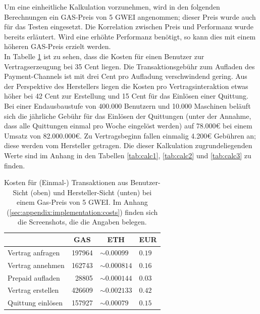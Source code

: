 Um eine einheitliche Kalkulation vorzunehmen, wird in den folgenden Berechnungen ein GAS-Preis von 5 GWEI angenommen; dieser Preis wurde auch für das Testen eingesetzt. Die Korrelation zwischen Preis und Performanz wurde bereits erläutert. Wird eine erhöhte Performanz benötigt, so kann dies mit einem höheren GAS-Preis erzielt werden.\\
In Tabelle \ref{tab:costs} ist zu sehen, dass die Kosten für einen Benutzer zur Vertragserzeugung bei 35 Cent liegen. Die Transaktionsgebühr zum Aufladen des Payment-Channels ist mit drei Cent pro Aufladung verschwindend gering. Aus der Perspektive des Herstellers liegen die Kosten pro Vertragsinteraktion etwas höher bei 42 Cent zur Erstellung und 15 Cent für das Einlösen einer Quittung. Bei einer Endausbaustufe von 400.000 Benutzern und 10.000 Maschinen beläuft sich die jährliche Gebühr für das Einlösen der Quittungen (unter der Annahme, dass alle Quittungen einmal pro Woche eingelöst werden) auf 78.000€ bei einem Umsatz von 82.000.000€. Zu Vertragsbeginn fallen einmalig 4.200€ Gebühren an; diese werden vom Hersteller getragen. Die dieser Kalkulation zugrundeliegenden Werte sind im Anhang in den Tabellen \ref{tab:calc1}, \ref{tab:calc2} und \ref{tab:calc3} zu finden.\\

\begin{table}[h]
\centering
\begin{tabular}{@{}lrll@{}}
\toprule
\multicolumn{1}{c}{\textbf{}} & \multicolumn{1}{c}{\textbf{GAS}} & \multicolumn{1}{c}{\textbf{ETH}} & \multicolumn{1}{c}{\textbf{EUR}} \\ \midrule
Vertrag anfragen & 197964 & $\sim 0.00099$ & $0.19$ \\
Vertrag annehmen & 162743 & $\sim 0.000814$ & $0.16$ \\
Prepaid aufladen & 28805 & $\sim 0.000144$ & $0.03$ \\ \bottomrule
Vertrag erstellen & 426609 & $\sim 0.002133$ & $0.42$  \\
Quittung einlösen & 157927 & $\sim 0.00079$ & $0.15$ \\ \bottomrule
\end{tabular}
\caption{Kosten für (Einmal-) Transaktionen aus Benutzer-Sicht (oben) und Hersteller-Sicht (unten) bei einem Gas-Preis von 5 GWEI. Im Anhang (\ref{sec:appendix:implementation:costs}) finden sich die Screenshots, die die Angaben belegen.}
\label{tab:costs}
\end{table}

